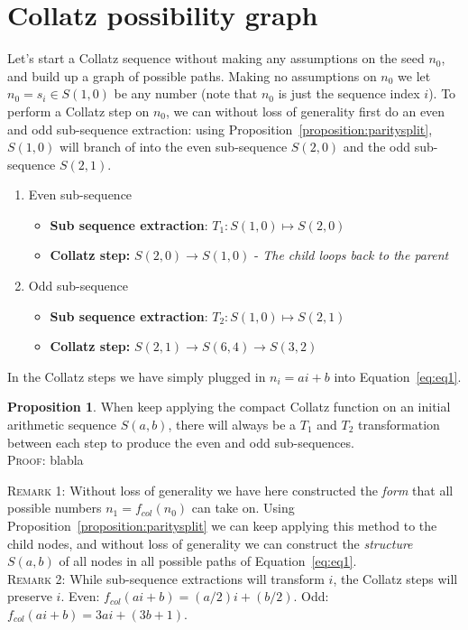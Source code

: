 \documentclass{article}
\theoremstyle{definition}
\newtheorem{proposition}{Proposition}[section]
\begin{document}
\section{Collatz possibility graph}
Let's start a Collatz sequence without making any assumptions on the seed $n_0$, and build up a graph of possible paths. Making no assumptions on $n_0$ we let $n_0=s_i\in S(1,0)$ be any number (note that $n_0$ is just the sequence index $i$). To perform a Collatz step on $n_0$, we can without loss of generality first do an even and odd sub-sequence extraction: using Proposition~\ref{proposition:paritysplit}, $S(1,0)$ will branch of into the even sub-sequence $S(2,0)$ and the odd sub-sequence $S(2,1)$.
\begin{enumerate}
    \item
    Even sub-sequence
    \begin{itemize}
        \item
        \textbf{Sub sequence extraction}: $T_1: S(1,0) \longmapsto S(2,0)$
        \item \textbf{Collatz step:} $S(2,0) \longrightarrow S(1,0)$ - \textit{The child loops back to the parent}
    \end{itemize}
    \item
    Odd sub-sequence
    \begin{itemize}
        \item
        \textbf{Sub sequence extraction}: $T_2: S(1,0) \longmapsto S(2,1)$
        \item \textbf{Collatz step:} $S(2,1) \longrightarrow S(6,4) \longrightarrow S(3,2)$
    \end{itemize}
\end{enumerate}
%
In the Collatz steps we have simply plugged in $n_i=ai+b$ into Equation~\ref{eq:eq1}.
\begin{proposition}\label{proposition:alwaystransforms} When keep applying the compact Collatz function on an initial arithmetic sequence $S(a,b)$, there will always be a $T_1$ and $T_2$ transformation between each step to produce the even and odd sub-sequences.
\\
\textsc{Proof:} blabla
\end{proposition}

\textsc{Remark 1:} Without loss of generality we have here constructed the \textit{form} that all possible numbers $n_1 = f_{col}(n_0)$ can take on. Using Proposition~\ref{proposition:paritysplit} we can keep applying this method to the child nodes, and without loss of generality we can construct the \textit{structure} $S(a,b)$ of all nodes in all possible paths of Equation~\ref{eq:eq1}.
%
\\[.4cm]
%
\textsc{Remark 2:} While sub-sequence extractions will transform $i$, the Collatz steps will preserve $i$. Even: $f_{col}(ai+b) = (a/2)i+(b/2)$. Odd: $f_{col}(ai+b)=3ai + (3b+1)$.
\end{document}
